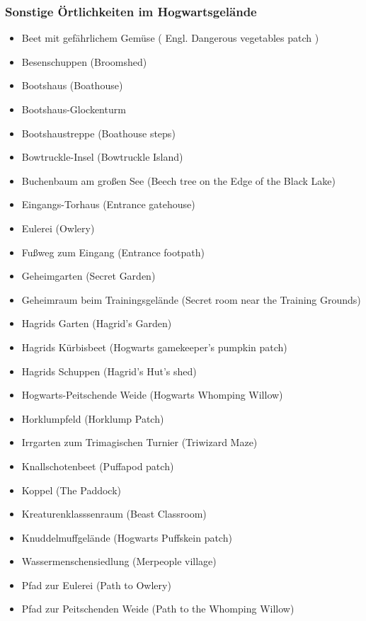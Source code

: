 \documentclass[a4paper, 10pt]{article}
\begin{document}
\subsubsection*{\large Sonstige Örtlichkeiten im Hogwartsgelände}
\vspace{10pt}
\begin{itemize}
    \item Beet mit gefährlichem Gemüse (  Engl.  Dangerous vegetables patch )
    \item Besenschuppen (Broomshed)
    \item Bootshaus (Boathouse)
    \item Bootshaus-Glockenturm
    \item Bootshaustreppe (Boathouse steps)
    \item Bowtruckle-Insel (Bowtruckle Island)
    \item Buchenbaum am großen See (Beech tree on the Edge of the Black Lake)
    \item Eingangs-Torhaus (Entrance gatehouse)
    \item Eulerei (Owlery)
    \item Fußweg zum Eingang (Entrance footpath)
    \item Geheimgarten (Secret Garden)
    \item Geheimraum beim Trainingsgelände (Secret room near the Training Grounds)
    \item Hagrids Garten (Hagrid's Garden)
    \item Hagrids Kürbisbeet (Hogwarts gamekeeper's pumpkin patch)
    \item Hagrids Schuppen (Hagrid's Hut's shed)
    \item Hogwarts-Peitschende Weide (Hogwarts Whomping Willow)
    \item Horklumpfeld (Horklump Patch)
    \item Irrgarten zum Trimagischen Turnier (Triwizard Maze)
    \item Knallschotenbeet (Puffapod patch)
    \item Koppel (The Paddock)
    \item Kreaturenklasssenraum (Beast Classroom)
    \item Knuddelmuffgelände (Hogwarts Puffskein patch)
    \item Wassermenschensiedlung (Merpeople village)
    \item Pfad zur Eulerei (Path to Owlery)
    \item Pfad zur Peitschenden Weide (Path to the Whomping Willow)

\end{itemize}
\end{document}
